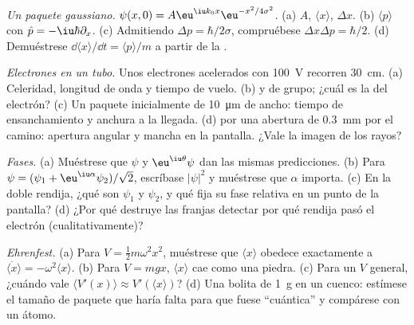 \begin{exercise}[$\star\star$]\label{exo:b2:schrodinger-wave-functions:6}
\emph{Un paquete gaussiano.} $\psi(x,0) = A\eu^{\iu k_0x}\eu^{-x^2/4\sigma^2}$. (a)
$A$, $\langle x\rangle$, $\Delta x$. (b) $\langle p\rangle$ con $\hat p =
-\iu\hbar\partial_x$. (c) Admitiendo $\Delta p = \hbar/2\sigma$, compruébese
$\Delta x\Delta p = \hbar/2$. (d) Demuéstrese $\dd\langle x\rangle/\dd t = \langle
p\rangle/m$ a partir de la .
\end{exercise}

\begin{exercise}[$\star\star$]\label{exo:b2:schrodinger-wave-functions:7}
\emph{Electrones en un tubo.} Unos electrones acelerados con \qty{100}{V}
recorren \qty{30}{cm}. (a) Celeridad, longitud de onda y tiempo de vuelo. (b)  y
de grupo; ¿cuál es la del electrón? (c) Un paquete inicialmente de
\qty{10}{\micro m} de ancho: tiempo de ensanchamiento y anchura a la llegada. (d) 
por una abertura de \qty{0.3}{mm} por el camino: apertura angular y mancha en la
pantalla. ¿Vale la imagen de los rayos?
\end{exercise}

\begin{exercise}[$\star\star$]\label{exo:b2:schrodinger-wave-functions:8}
\emph{Fases.} (a) Muéstrese que $\psi$ y $\eu^{\iu\theta}\psi$ dan las mismas
predicciones. (b) Para $\psi = (\psi_1 + \eu^{\iu\alpha}\psi_2)/\sqrt2$, escríbase
$|\psi|^2$ y muéstrese que $\alpha$ importa. (c) En la doble rendija, ¿qué
son $\psi_1$ y $\psi_2$, y qué fija su fase relativa en un punto
de la pantalla? (d) ¿Por qué destruye las franjas detectar por qué rendija pasó
el electrón (cualitativamente)?
\end{exercise}

\begin{exercise}[$\star\star$]\label{exo:b2:schrodinger-wave-functions:9}
\emph{Ehrenfest.} (a) Para $V = \tfrac12m\omega^2x^2$, muéstrese que $\langle
x\rangle$ obedece exactamente a $\ddot{\langle x\rangle} = -\omega^2\langle x\rangle$.
(b) Para $V = mgx$, $\langle x\rangle$ cae como una piedra. (c) Para un $V$
general, ¿cuándo vale $\langle V'(x)\rangle \approx V'(\langle x\rangle)$? (d) Una
bolita de \qty{1}{g} en un cuenco: estímese el tamaño de paquete que haría falta para
que fuese ``cuántica'' y compárese con un átomo.
\end{exercise}

